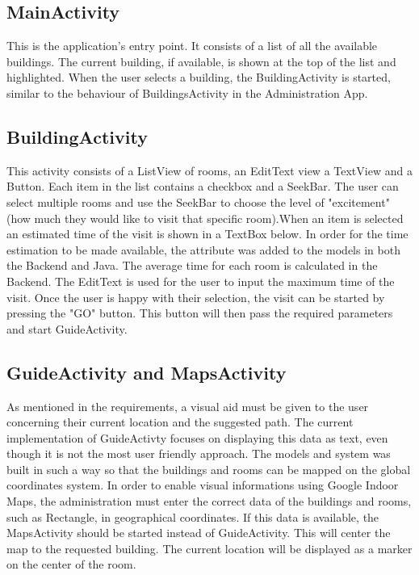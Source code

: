 \subsection{MainActivity}
This is the application's entry point. It consists of a list of all the available buildings. The current building, if available, is shown at the top of the list and highlighted.  
When the user selects a building, the BuildingActivity is started, similar to the behaviour of BuildingsActivity in the Administration App.
\subsection{BuildingActivity}
This activity consists of a ListView of rooms, an EditText view a TextView and a Button. Each item in the list contains a checkbox and a SeekBar. The user can select multiple rooms and use the SeekBar to choose the level of "excitement" (how much they would like to visit that specific room).When an item is selected an estimated time of the visit is shown in a TextBox below. In order for the time estimation to be made available, the attribute was added to the models in both the Backend and Java. The average time for each room is calculated in the Backend. The EditText is used for the user to input the maximum time of the visit. Once the user is happy with their selection, the visit can be started by pressing the "GO" button. This button will then pass the required parameters and start GuideActivity.
\subsection{GuideActivity and MapsActivity}
As mentioned in the requirements, a visual aid must be given to the user concerning their current location and the suggested path. The current implementation of GuideActivty focuses on displaying this data as text, even though it is not the most user friendly approach. The models and system was built in such a way so that the buildings and rooms can be mapped on the global coordinates system. In order to enable visual informations using Google Indoor Maps, the administration must enter the correct data of the buildings and rooms, such as Rectangle, in geographical coordinates. If this data is available, the MapsActivity should be started instead of GuideActivity. This will center the map to the requested building. The current location will be displayed as a marker on the center of the room.

